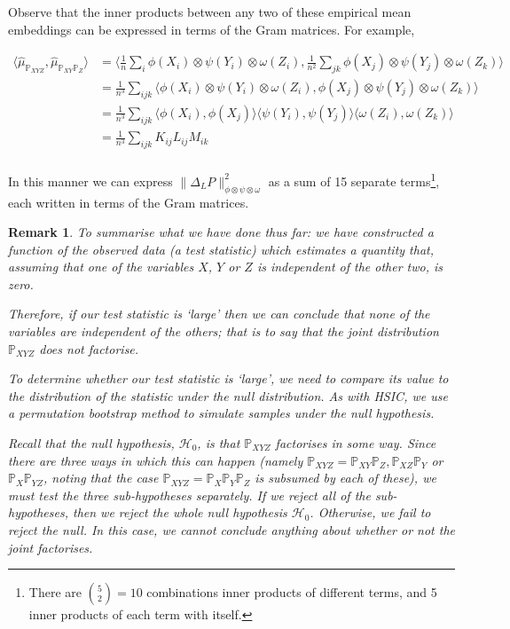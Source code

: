 \documentclass[12pt]{article}
\newtheorem*{remark}{Remark}
\numberwithin{claim}{section}
\numberwithin{lemma}{section}
\numberwithin{theorem}{section}
\begin{document}
Observe that the inner products between any two of these empirical mean embeddings can be expressed in terms of the Gram matrices. For example,

\begin{align*}
\langle \hat\mu_{\mathbb{P}_{XYZ}} ,\hat\mu_{\mathbb{P}_{XY}\mathbb{P}_{Z}}  \rangle &= \langle \frac{1}{n}\sum_{i} \phi(X_i) \otimes \psi(Y_i) \otimes \omega(Z_i) ,  \frac{1}{n^2}\sum_{jk} \phi(X_j) \otimes \psi(Y_j) \otimes \omega(Z_k)\rangle  \\
&= \frac{1}{n^3} \sum_{ijk}\langle  \phi(X_i) \otimes \psi(Y_i) \otimes \omega(Z_i) ,   \phi(X_j) \otimes \psi(Y_j) \otimes \omega(Z_k)\rangle  \\
&= \frac{1}{n^3} \sum_{ijk}\langle  \phi(X_i) , \phi(X_j)\rangle \langle \psi(Y_i), \psi(Y_j) \rangle \langle \omega(Z_i) , \omega(Z_k)\rangle  \\
& = \frac{1}{n^3} \sum_{ijk} K_{ij}L_{ij}M_{ik}  \\
\end{align*}

In this manner we can express  $\| \Delta_LP \|_{\phi \otimes \psi \otimes \omega}^2$ as a sum of 15 separate terms\footnote{There are $\binom{5}{2}=10$ combinations inner products of different terms, and 5 inner products of each term with itself.}, each written in terms of the Gram matrices. 






\begin{remark}
To summarise what we have done thus far: we have constructed a function of the observed data (a \emph{test statistic}) which estimates a quantity that, assuming that one of the variables $X$, $Y$ or $Z$ is independent of the other two, is zero.

Therefore, if our test statistic is `large' then we can conclude that none of the variables are independent of the others; that is to say that the joint distribution $\mathbb{P}_{XYZ}$ does not factorise.

To determine whether our test statistic is `large', we need to compare its value to the distribution of the statistic under the null distribution. As with HSIC, we use a \emph{permutation bootstrap} method to simulate samples under the null hypothesis.

Recall that the null hypothesis, $\mathcal{H}_0$, is that $\mathbb{P}_{XYZ}$ factorises in some way. Since there are three ways in which this can happen (namely $\mathbb{P}_{XYZ} = \mathbb{P}_{XY}\mathbb{P}_{Z}, \mathbb{P}_{XZ}\mathbb{P}_{Y}$ or  $\mathbb{P}_{X}\mathbb{P}_{YZ}$, noting that the case $\mathbb{P}_{XYZ} = \mathbb{P}_{X}\mathbb{P}_{Y}\mathbb{P}_{Z}$ is subsumed by each of these), we must test the three sub-hypotheses separately. If we reject all of the sub-hypotheses, then we reject the whole null hypothesis $\mathcal{H}_0$. Otherwise, we fail to reject the null. In this case, we cannot conclude anything about whether or not the joint factorises.
\end{remark}
\end{document}
